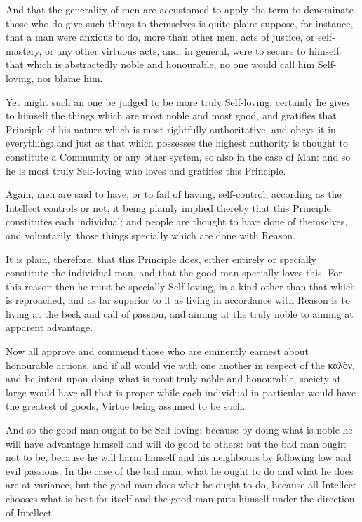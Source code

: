 And that the generality of men are accustomed to apply the term to denominate
those who do give such things to themselves is quite plain: suppose, for
instance, that a man were anxious to do, more than other men, acts of justice,
or self-mastery, or any other virtuous acts, and, in general, were to secure to
himself that which is abstractedly noble and honourable, no one would call him
Self-loving, nor blame him.

Yet might such an one be judged to be more truly Self-loving: certainly he
gives to himself the things which are most noble and most good, and gratifies
that Principle of his nature which is most rightfully authoritative, and obeys
it in everything: and just as that which possesses the highest authority is
thought to constitute a Community or any other system, so also in the case of
Man: and so he is most truly Self-loving who loves and gratifies this
Principle.

Again, men are said to have, or to fail of having, self-control, according as
the Intellect controls or not, it being plainly implied thereby that this
Principle constitutes each individual; and people are thought to have done of
themselves, and voluntarily, those things specially which are done with Reason.

It is plain, therefore, that this Principle does, either entirely or specially
constitute the individual man, and that the good man specially loves this. For
this reason then he must be specially Self-loving, in a kind other than that
which is reproached, and as far superior to it as living in accordance with
Reason is to living at the beck and call of passion, and aiming at the truly
noble to aiming at apparent advantage.

Now all approve and commend those who are eminently earnest about honourable
actions, and if all would vie with one another in respect of the
καλὸν, and be intent upon doing what is most truly
noble and honourable, society at large would have all that is proper while each
individual in particular would have the greatest of goods, Virtue being assumed
to be such.

And so the good man ought to be Self-loving: because by doing what is noble he
will have advantage himself and will do good to others: but the bad man ought
not to be, because he will harm himself and his neighbours by following low and
evil passions. In the case of the bad man, what he ought to do and what he does
are at variance, but the good man does what he ought to do, because all
Intellect chooses what is best for itself and the good man puts himself under
the direction of Intellect.

